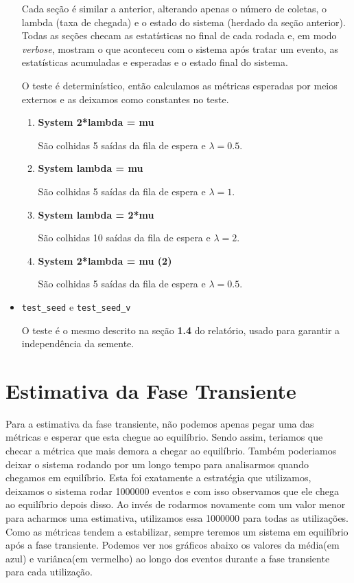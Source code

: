 \documentclass[a4paper]{article}
\newcommand{\inlcode}{\texttt}
\begin{document}
\begin{itemize}
        Cada seção é similar a anterior,
        alterando apenas o número de coletas,
        o lambda (taxa de chegada) e
        o estado do sistema (herdado da seção anterior).
        Todas as seções
        checam as estatísticas no final de cada rodada
        e, em modo \emph{verbose},
        mostram o que aconteceu com o sistema após tratar um evento,
        as estatísticas acumuladas e esperadas e
        o estado final do sistema.

        O teste é determinístico, então
        calculamos as métricas esperadas
        por meios externos e
        as deixamos como constantes no teste.
        \begin{enumerate}
            \item \textbf{System 2*lambda = mu} \par
                São colhidas 5 saídas da fila de espera
                e \(\lambda = 0.5\).
            \item \textbf{System lambda = mu} \par
                São colhidas 5 saídas da fila de espera
                e \(\lambda = 1\).
            \item \textbf{System lambda = 2*mu} \par
                São colhidas 10 saídas da fila de espera
                e \(\lambda = 2\).
            \item \textbf{System 2*lambda = mu (2)} \par
                São colhidas 5 saídas da fila de espera
                e \(\lambda = 0.5\).
        \end{enumerate}
    \item \inlcode{test\_seed} e \inlcode{test\_seed\_v} \par
        O teste é o mesmo descrito
        na seção \textbf{1.4} do relatório,
        usado para garantir a independência da semente.
\end{itemize}

\newpage
\section{Estimativa da Fase Transiente}
Para a estimativa da fase transiente, não podemos apenas pegar uma das métricas e esperar que esta chegue ao equilíbrio. Sendo assim, teriamos que checar a métrica que mais demora a chegar ao equilíbrio. Também poderiamos deixar o sistema rodando por um longo tempo para analisarmos quando chegamos em equilíbrio. Esta foi exatamente a estratégia que utilizamos, deixamos o sistema rodar 1000000 eventos e com isso observamos que ele chega ao equilíbrio depois disso. Ao invés de rodarmos novamente com um valor menor para acharmos uma estimativa, utilizamos essa 1000000 para todas as utilizações. Como as métricas tendem a estabilizar, sempre teremos um sistema em equilíbrio após a fase transiente. Podemos ver nos gráficos abaixo os valores da média(em azul) e variânca(em vermelho) ao longo dos eventos durante a fase transiente para cada utilização.
\end{document}
